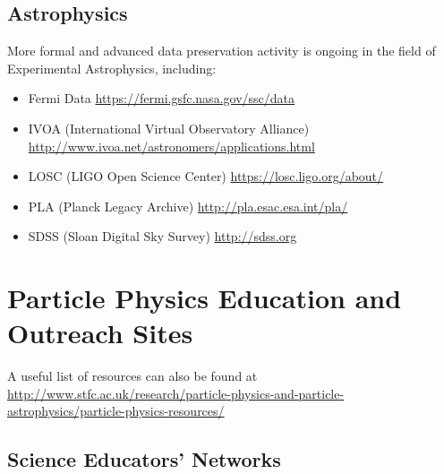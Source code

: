 \subsection{Astrophysics}\label{astrophysics-1}

More formal and advanced data preservation activity is ongoing in the
field of Experimental Astrophysics, including:

\begin{itemize}
\tightlist
\item
  Fermi Data \url{https://fermi.gsfc.nasa.gov/ssc/data}
\item
  IVOA (International Virtual Observatory Alliance)
  \url{http://www.ivoa.net/astronomers/applications.html}
\item
  LOSC (LIGO Open Science Center) \url{https://losc.ligo.org/about/}
\item
  PLA (Planck Legacy Archive) \url{http://pla.esac.esa.int/pla/}
\item
  SDSS (Sloan Digital Sky Survey) \url{http://sdss.org}
\end{itemize}

\section{Particle Physics Education and Outreach
Sites}\label{particle-physics-education-and-outreach-sites}

A useful list of resources can also be found at
\url{http://www.stfc.ac.uk/research/particle-physics-and-particle-astrophysics/particle-physics-resources/}

\subsection{Science Educators'
Networks}\label{science-educators-networks}

